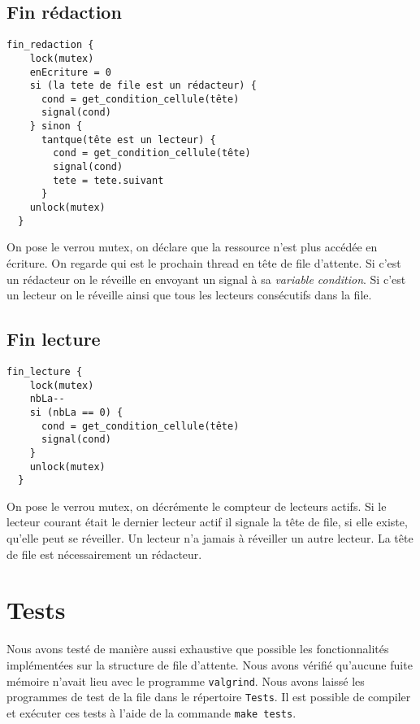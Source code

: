 \documentclass[11pt]{article}
\theoremstyle{definition}
\theoremstyle{definition}
\begin{document}
\subsection{Fin rédaction}
\begin{lstlisting}[columns=fixed,basicstyle=\small\ttfamily]
  fin_redaction {
    lock(mutex)
    enEcriture = 0
    si (la tete de file est un rédacteur) {
      cond = get_condition_cellule(tête)
      signal(cond)
    } sinon {
      tantque(tête est un lecteur) {
        cond = get_condition_cellule(tête)
        signal(cond)
        tete = tete.suivant
      }
    unlock(mutex)
  }
\end{lstlisting}
On pose le verrou mutex, on déclare que la ressource n'est plus accédée en écriture.
On regarde qui est le prochain thread en tête de file d'attente.
Si c'est un rédacteur on le réveille en envoyant un signal à sa \textit{variable condition}.
Si c'est un lecteur on le réveille ainsi que tous les lecteurs consécutifs dans la file.

\subsection{Fin lecture}
\begin{lstlisting}[columns=fixed,basicstyle=\small\ttfamily]
  fin_lecture {
    lock(mutex)
    nbLa--
    si (nbLa == 0) {
      cond = get_condition_cellule(tête)
      signal(cond)
    }
    unlock(mutex)
  }
\end{lstlisting}
On pose le verrou mutex, on décrémente le compteur de lecteurs actifs.
Si le lecteur courant était le dernier lecteur actif il signale la tête de file,
si elle existe, qu'elle peut se réveiller. Un lecteur n'a jamais à réveiller un autre lecteur.
La tête de file est nécessairement un rédacteur.

\section{Tests}
Nous avons testé de manière aussi exhaustive que possible
les fonctionnalités implémentées sur la structure de file d'attente.
Nous avons vérifié qu'aucune fuite mémoire n'avait lieu avec le programme \texttt{valgrind}.
Nous avons laissé les programmes de test de la file dans le répertoire \texttt{Tests}.
Il est possible de compiler et exécuter ces tests à l'aide de la commande \texttt{make tests}.
\end{document}
